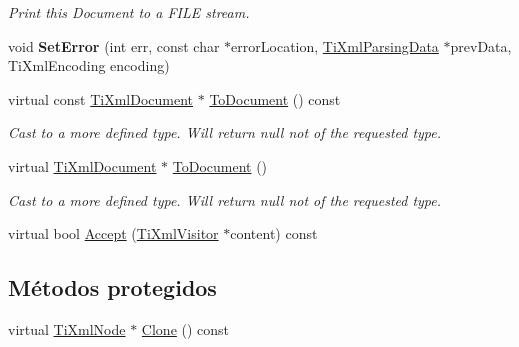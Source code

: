 \begin{DoxyCompactItemize}
\begin{DoxyCompactList}\small\item\em \-Print this \-Document to a \-F\-I\-L\-E stream. \end{DoxyCompactList}\item 
\hypertarget{classTiXmlDocument_a735c23e318597b920c94eae77fa206de}{void {\bfseries \-Set\-Error} (int err, const char $\ast$error\-Location, \hyperlink{classTiXmlParsingData}{\-Ti\-Xml\-Parsing\-Data} $\ast$prev\-Data, \-Ti\-Xml\-Encoding encoding)}\label{classTiXmlDocument_a735c23e318597b920c94eae77fa206de}

\item 
\hypertarget{classTiXmlDocument_a1dc977bde3e4fe85a8eb9d88a35ef5a4}{virtual const \hyperlink{classTiXmlDocument}{\-Ti\-Xml\-Document} $\ast$ \hyperlink{classTiXmlDocument_a1dc977bde3e4fe85a8eb9d88a35ef5a4}{\-To\-Document} () const }\label{classTiXmlDocument_a1dc977bde3e4fe85a8eb9d88a35ef5a4}

\begin{DoxyCompactList}\small\item\em \-Cast to a more defined type. \-Will return null not of the requested type. \end{DoxyCompactList}\item 
\hypertarget{classTiXmlDocument_a1025d942a1f328fd742d545e37efdd42}{virtual \hyperlink{classTiXmlDocument}{\-Ti\-Xml\-Document} $\ast$ \hyperlink{classTiXmlDocument_a1025d942a1f328fd742d545e37efdd42}{\-To\-Document} ()}\label{classTiXmlDocument_a1025d942a1f328fd742d545e37efdd42}

\begin{DoxyCompactList}\small\item\em \-Cast to a more defined type. \-Will return null not of the requested type. \end{DoxyCompactList}\item 
virtual bool \hyperlink{classTiXmlDocument_a3daab2f472418ef66315750202f762ae}{\-Accept} (\hyperlink{classTiXmlVisitor}{\-Ti\-Xml\-Visitor} $\ast$content) const 
\end{DoxyCompactItemize}
\subsection*{\-Métodos protegidos}
\begin{DoxyCompactItemize}
\item 
virtual \hyperlink{classTiXmlNode}{\-Ti\-Xml\-Node} $\ast$ \hyperlink{classTiXmlDocument_ac9e8f09b23454d953b32d1b65cd1409e}{\-Clone} () const 
\end{DoxyCompactItemize}


